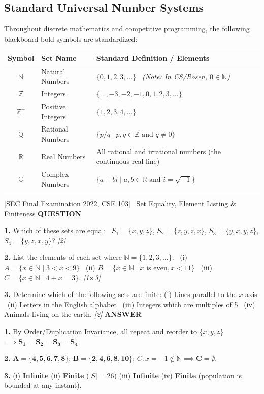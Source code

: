 \documentclass[11pt,a4paper]{article}
\newcommand{\Qlabel}{\textbf{\color{navy}\footnotesize\MakeUppercase{Question}}\par\smallskip}
\newcommand{\Alabel}{\textbf{\color{teal}\footnotesize\MakeUppercase{Answer}}\par\smallskip}
\begin{document}
\subsection{Standard Universal Number Systems}
Throughout discrete mathematics and competitive programming, the following blackboard bold symbols are standardized:
\begin{center}
\renewcommand{\arraystretch}{1.2}
\begin{tabularx}{\textwidth}{c l X}
\toprule
\rowcolor{navy!10} \textbf{Symbol} & \textbf{Set Name} & \textbf{Standard Definition / Elements} \\
\midrule
$\mathbb{N}$ & Natural Numbers & $\{0, 1, 2, 3, \dots\}$ \ \textit{(Note: In CS/Rosen, $0 \in \mathbb{N}$)} \\
$\mathbb{Z}$ & Integers & $\{\dots, -3, -2, -1, 0, 1, 2, 3, \dots\}$ \\
$\mathbb{Z}^+$ & Positive Integers & $\{1, 2, 3, 4, \dots\}$ \\
$\mathbb{Q}$ & Rational Numbers & $\{p/q \mid p, q \in \mathbb{Z} \text{ and } q \neq 0\}$ \\
$\mathbb{R}$ & Real Numbers & All rational and irrational numbers (the continuous real line) \\
$\mathbb{C}$ & Complex Numbers & $\{a + bi \mid a, b \in \mathbb{R} \text{ and } i = \sqrt{-1}\}$ \\
\bottomrule
\end{tabularx}
\end{center}

\begin{exambox}{[SEC Final Examination 2022, CSE 103] \ Set Equality, Element Listing \& Finiteness}
\Qlabel
\textbf{1.} Which of these sets are equal: \ $S_1 = \{x, y, z\}$, $S_2 = \{z, y, z, x\}$, $S_3 = \{y, x, y, z\}$, $S_4 = \{y, z, x, y\}$? \hfill\textit{[2]}

\textbf{2.} List the elements of each set where $\mathbb{N} = \{1,2,3,\dots\}$: \ (i) $A = \{x \in \mathbb{N} \mid 3 < x < 9\}$ \ (ii) $B = \{x \in \mathbb{N} \mid x \text{ is even}, x < 11\}$ \ (iii) $C = \{x \in \mathbb{N} \mid 4 + x = 3\}$. \hfill\textit{[1$\times$3]}

\textbf{3.} Determine which of the following sets are finite: (i) Lines parallel to the $x$-axis \ (ii) Letters in the English alphabet \ (iii) Integers which are multiples of 5 \ (iv) Animals living on the earth. \hfill\textit{[2]}
\tcblower
\Alabel
\textbf{1.} By Order/Duplication Invariance, all repeat and reorder to $\{x,y,z\}$ $\implies \mathbf{S_1=S_2=S_3=S_4}$.

\textbf{2.} $\mathbf{A = \{4,5,6,7,8\}}$; \quad $\mathbf{B = \{2,4,6,8,10\}}$; \quad $C: x=-1\notin\mathbb{N} \implies \mathbf{C=\emptyset}$.

\textbf{3.} (i) \textbf{Infinite} \quad (ii) \textbf{Finite} ($|S|=26$) \quad (iii) \textbf{Infinite} \quad (iv) \textbf{Finite} (population is bounded at any instant).
\end{exambox}
\end{document}
